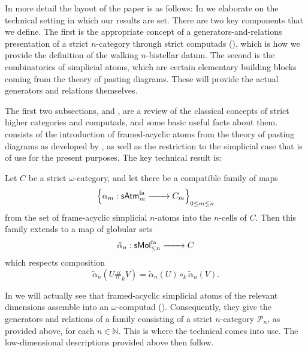 \documentclass[12pt,a4paper]{article}
\numberwithin{equation}{section}
\newcommand{\atm}[2][s]{%
    \ifx b#1\mathsf{Atm}_{#2}\else
    \ifx s#1\mathsf{sAtm}_{#2}\else
    \ifx f#1\mathsf{sAtm}^{\mathrm{fa}}_{#2}\else
    \mathrm{Illegal~option}%
    \fi\fi\fi
}
\newcommand{\mol}[2][s]{%
    \ifx b#1\mathsf{Mol}_{#2}\else
    \ifx s#1\mathsf{sMol}_{#2}\else
    \ifx f#1\mathsf{sMol}^{\mathrm{fa}}_{#2}\else
    \mathrm{Illegal~option}%
    \fi\fi\fi
}
\begin{document}
In more detail the layout of the paper is as follows: In  we elaborate on the technical setting in which our results are set. There are two key components that we define. The first is the appropriate concept of a generators-and-relations presentation of a strict $n$-category through strict computads (), which is how we provide the definition of the walking $n$-bistellar datum. The second is the combinatorics of simplicial atoms, which are certain elementary building blocks coming from the theory of pasting diagrams. These will provide the actual generators and relations themselves.

The first two subsections,  and , are a review of the classical concepts of strict higher categories and computads, and some basic useful facts about them.  consists of the introduction of framed-acyclic atoms from the theory of pasting diagrams as developed by \cite{hadzihasanovic}, as well as the restriction to the simplicial case that is of use for the present purposes. The key technical result is:
%
\begin{specialtheorem}
    Let $C$ be a strict $\omega$-category, and let there be a compatible family of maps
    \begin{equation}
        \left\{ \alpha_m: \atm[f]{m} \xrightarrow[\phantom{A}]{\qquad} C_m \right\}_{0 \leq m \leq n}
    \end{equation}
    from the set of frame-acyclic simplicial $n$-atoms into the $n$-cells of $C$. Then this family extends to a map of globular sets
    \begin{equation}
        \tilde{\alpha}_n: \mol[f]{\leq n} \xrightarrow{\qquad} C
    \end{equation}
    which respects composition
    \begin{equation}
        \tilde{\alpha}_n(U \#_k V) = \tilde{\alpha}_n(U) \circ_k \tilde{\alpha}_n(V).
    \end{equation} 
\end{specialtheorem}

In  we will actually see that framed-acyclic simplicial atoms of the relevant dimensions assemble into an $\omega$-computad (). Consequently, they give the generators and relations of a family consisting of a strict $n$-category $\mathscr{P}_n$, as provided above, for each $n \in \mathbb{N}$. This is where the technical  comes into use. The low-dimensional descriptions provided above then follow.
\end{document}
